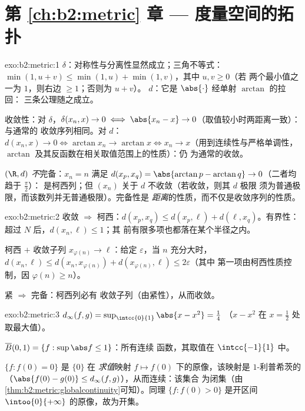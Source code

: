 \section*{第 \ref{ch:b2:metric} 章 --- 度量空间的拓扑}

\begin{solution}{exo:b2:metric:1}
$\delta$：对称性与分离性显然成立；三角不等式：
$\min(1, u + v) \leq \min(1,u) + \min(1,v)$，其中 $u, v \geq 0$（若
两个最小值之一为 $1$，则右边 $\geq 1$；否则为 $u + v$）。
$d$：它是 $\abs{\cdot}$ 经单射 $\arctan$ 的拉回：
三条公理随之成立。

收敛性：对 $\delta$，$\delta(x_n, x) \to 0 \iff \abs{x_n - x}
\to 0$（取值较小时两距离一致）：与通常的
收敛序列相同。对 $d$：$d(x_n, x) \to 0 \iff \arctan x_n \to
\arctan x \iff x_n \to x$（用到连续性与严格单调性，
$\arctan$ 及其反函数在相关取值范围上的性质）：仍
为通常的收敛。

$(\R, d)$ \emph{不}完备：$x_n = n$ 满足 $d(x_p, x_q)
= \abs{\arctan p - \arctan q} \to 0$（二者均趋于 $\frac\pi2$）：
是柯西列；但 $(x_n)$ 关于 $d$ 不收敛（若收敛，则其 $d$ 极限
须为普通极限，而该数列并无普通极限）。完备性是
\emph{距离}的性质，而不仅是收敛序列的性质。
\end{solution}

\begin{solution}{exo:b2:metric:2}
收敛 $\Rightarrow$ 柯西：$d(x_p, x_q) \leq d(x_p, \ell) +
d(\ell, x_q)$。有界性：超过 $N$ 后，$d(x_n, \ell) \leq 1$；其
前有限多项也都落在某个半径之内。

柯西 $+$ 收敛子列 $x_{\varphi(n)} \to \ell$：给定
$\varepsilon$，当 $n$ 充分大时，$d(x_n, \ell) \leq d(x_n,
x_{\varphi(n)}) + d(x_{\varphi(n)}, \ell) \leq 2\varepsilon$（其中
第一项由柯西性质控制，因 $\varphi(n) \geq n$）。

紧 $\Rightarrow$ 完备：柯西列必有
收敛子列（由紧性），从而收敛。
\end{solution}

\begin{solution}{exo:b2:metric:3}
$d_\infty(f, g) = \sup_{\intcc{0}{1}} \abs{x - x^2} = \frac14$
（$x - x^2$ 在 $x = \frac12$ 处取最大值）。

$\overline B(0, 1) = \{f : \sup\abs f \leq 1\}$：所有连续
函数，其取值在 $\intcc{-1}{1}$ 中。

$\{f : f(0) = 0\}$ 是 $\{0\}$ 在
\emph{求值}映射 $f \mapsto f(0)$ 下的原像，该映射是 $1$-利普希茨的
（$\abs{f(0) - g(0)} \leq d_\infty(f,g)$），从而连续：该集合
为闭集（由\cref{thm:b2:metric:globalcontinuity}可知）。同理 $\{f :
f(0) > 0\}$ 是开区间 $\intoo{0}{+\infty}$ 的原像，故为开集。
\end{solution}

